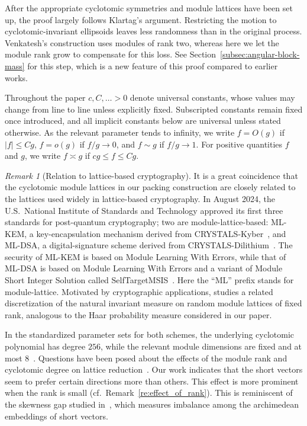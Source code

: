 \documentclass[11pt]{article}
\theoremstyle{remark}
\newtheorem{remark}[theorem]{Remark}
\begin{document}
After the appropriate cyclotomic symmetries and module lattices have been set
up, the proof largely follows Klartag's argument.  Restricting the motion to
cyclotomic-invariant ellipsoids leaves
less randomness than in the original process.  Venkatesh's construction uses
modules of rank two, whereas here we let the module rank grow to compensate
for this loss.  See Section~\ref{subsec:angular-block-mass} for this step,
which is a new feature of this proof compared to earlier works.

Throughout the paper $c,C,\ldots>0$ denote universal constants,
whose values may change from line to line unless explicitly fixed.  Subscripted
constants remain fixed once introduced, and all implicit constants below are
universal unless stated otherwise.  As the relevant parameter tends to
infinity, we write $f=O(g)$ if $|f|\le Cg$, $f=o(g)$ if $f/g\to0$, and
$f\sim g$ if $f/g\to1$.  For positive quantities $f$ and $g$, we write
$f\asymp g$ if $cg\le f\le Cg$.


\begin{remark}[Relation to lattice-based cryptography]

It is a great coincidence that the cyclotomic module lattices in our packing
construction are closely related to the lattices used widely in
lattice-based cryptography.  In August 2024, the U.S.\ National Institute of
Standards and Technology approved its first three standards for post-quantum
cryptography; two are module-lattice-based: ML-KEM, a key-encapsulation
mechanism derived from CRYSTALS-Kyber~\cite{BDKLLSSSS}, and ML-DSA, a
digital-signature scheme derived from CRYSTALS-Dilithium~\cite{DKLLSSS}.  The
security of ML-KEM is based on Module Learning With Errors, while that of
ML-DSA is based on Module Learning With Errors and a variant of Module Short
Integer Solution called SelfTargetMSIS~\cite{Nat24a,Nat24b}.  Here the ``ML''
prefix stands for module-lattice.  Motivated by cryptographic applications,
\cite{BPTW} studies a related discretization of the natural invariant
measure on random module lattices of fixed rank, analogous to the Haar
probability measure considered in our paper.

In the standardized parameter sets for both schemes, the underlying cyclotomic
polynomial has degree $256$, while the relevant module dimensions are fixed and
at most $8$~\cite{Nat24a,Nat24b}.  Questions have been posed about the effects
of the module rank and cyclotomic degree on lattice
reduction~\cite{DEP}.  Our work indicates that the short vectors seem
to prefer certain directions more than others.  This effect is more prominent
when the rank is small (cf.\ Remark~\ref{re:effect_of_rank}).  This is
reminiscent of the skewness gap studied in~\cite[\S 4.4]{DEP}, which
measures imbalance among the archimedean embeddings of short vectors.
\end{remark}
\end{document}
